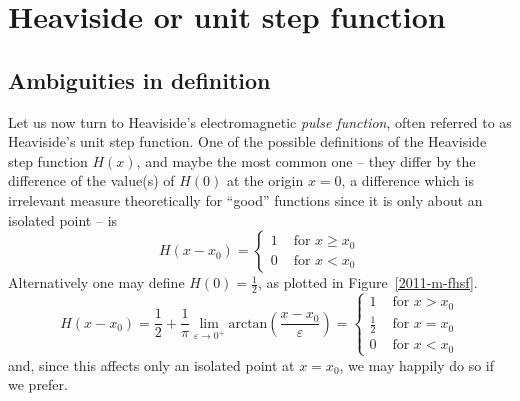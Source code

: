 
\section{Heaviside or unit step function}

\subsection{Ambiguities in definition}
Let us now turn
to Heaviside's electromagnetic {\em pulse function}, often referred to as Heaviside's unit step function.
One of the possible definitions of the Heaviside step function $H(x)$, and maybe the most common one --
they differ by the difference of the value(s) of $H(0)$ at the origin $x=0$, a difference which is irrelevant measure theoretically for ``good'' functions
since it is only about an isolated point --
is
\begin{equation}
H(x-x_0)
=
\left\{
\begin{array}{rl}
1&\textrm{ for } x\ge x_0\\
0&\textrm{ for } x < x_0
\end{array}
\right.
\label{2011-m-di-edhf}
\end{equation}
Alternatively one may define $H(0)=\frac{1}{2}$, as plotted in Figure~\ref{2011-m-fhsf}.
\begin{equation}
H(x-x_0)
=   \frac{1}{2} + \frac{1}{\pi } \lim_{\varepsilon \rightarrow 0^+} \textrm{arctan}\left( \frac{x-x_0}{\varepsilon} \right)
=
\left\{
\begin{array}{rl}
1&\textrm{ for } x > x_0\\
\frac{1}{2}&\textrm{ for } x = x_0\\
0&\textrm{ for } x < x_0
\end{array}
\right.
\label{2012-m-di-hsfoh}
\end{equation}
and, since this affects only an isolated point at $x=x_0$, we may happily do so if we prefer.
